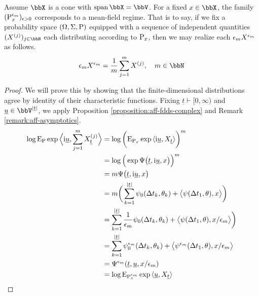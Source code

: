 \begin{proposition}
  \label{proposition:mean-field-asymptotics}
  Assume $\stateSpace$ is a cone with $\operatorname{span}\stateSpace = \vecSpace$.
  For a fixed $\stateVar \in \stateSpace$, the family $({\operatorname{P}}^{\epsilon_m}_x)_{\epsilon>0}$ corresponds to a mean-field regime.
  That is to say, if we fix a probability space $(\Omega, \Sigma, {\operatorname{P}})$ equipped with a sequence of independent quantities $(\X^{(j)})_{j\in\bbN}$ each distributing according to ${\operatorname{P}}_x$,
  then we may realize each $\epsilon_m X^{\epsilon_m}$ as follows.
  \begin{equation*}
    \epsilon_m \X^{\epsilon_m} = \frac1m \sum_{j=1}^m \X^{(j)}, \quad m \in \bbN
  \end{equation*}
\end{proposition}
\begin{proof}
  \label{proof:proposition:mean-field-asymptotics}
  We will prove this by showing that the finite-dimensional distributions agree by identity of their characteristic functions.
  Fixing $\underline t \vdash [0,\infty)$ and $\underline\momentVar \in \vecSpace^{|\underline t|}$, we apply Proposition \ref{proposition:aff-fdds-complex} and Remark \ref{remark:aff-asymptotics}.
  \begin{align*}
    \log{\operatorname{E}}_{\operatorname{P}}\exp{\Big\langle {\rm i}\underline{u}, \sum_{j=1}^m X^{(j)}_{\underline t} \Big\rangle}
    &= \log\bigg({\operatorname{E}}_{{\operatorname{P}}_x}\exp{\langle {\rm i}\underline{u}, X_{\underline t} \rangle} \bigg)^m \\
    &= \log\Big(\exp\Psi\big(\underline t, {\rm i}\underline{u}, x \big) \Big)^m \\
    &=  m \Psi\big(\underline t, {\rm i}\underline{u}, x \big)  \\
    &= m \bigg( \sum_{k=1}^{|\underline t|} \psi_0(\Delta t_k, \theta_k) + {\big\langle \psi(\Delta t_1, \theta) , x \big\rangle} \bigg)  \\
    &= \sum_{k=1}^{|\underline t|} \frac{1}{\epsilon_m}\psi_0(\Delta t_k, \theta_k) + {\big\langle \psi(\Delta t_1, \theta) , x/\epsilon_m \big\rangle} \bigg)  \\
    &= \sum_{k=1}^{|\underline t|} \psi^{\epsilon_m}_0(\Delta t_k, \theta_k) + {\big\langle \psi^{\epsilon_m}(\Delta t_1, \theta) , x/\epsilon_m \big\rangle}  \\
    &= \Psi^{\epsilon_m}(\underline t, \underline{u}, x/\epsilon_m) \\
    &= \log{\operatorname{E}}_{{\operatorname{P}}^{\epsilon_m}_x} \exp{\langle \underline{u}, X_{\underline t} \rangle}
  \end{align*}
\end{proof}
